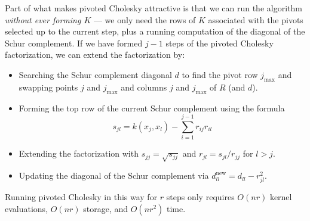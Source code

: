 \documentclass[12pt, leqno]{article} %
\begin{document}
Part of what makes pivoted Cholesky attractive is that we can run
the algorithm {\em without ever forming $K$} --- we only need the rows
of $K$ associated with the pivots selected up to the current step,
plus a running computation of the diagonal of the Schur complement.
If we have formed $j-1$ steps of the pivoted Cholesky factorization,
we can extend the factorization by:
\begin{itemize}
\item Searching the Schur complement diagonal $d$ to find
  the pivot row $j_{\max}$ and swapping points $j$ and
  $j_{\max}$ and columns $j$ and $j_{\max}$ of $R$ (and $d$).
\item Forming the top row of the current Schur complement using the formula
  \[
    s_{jl} = k(x_j, x_l) - \sum_{i=1}^{j-1} r_{ij} r_{il}
  \]
\item Extending the factorization with $s_{jj} = \sqrt{s_{jj}}$ and 
  $r_{jl} = s_{jl} / r_{jj}$ for $l > j$.
\item Updating the diagonal of the Schur complement via
  $d_{ll}^{\mathrm{new}} = d_{ll} - r_{jl}^2$.
\end{itemize}
Running pivoted Cholesky in this way for $r$ steps only requires
$O(nr)$ kernel evaluations, $O(nr)$ storage, and $O(nr^2)$ time.




\end{document}
